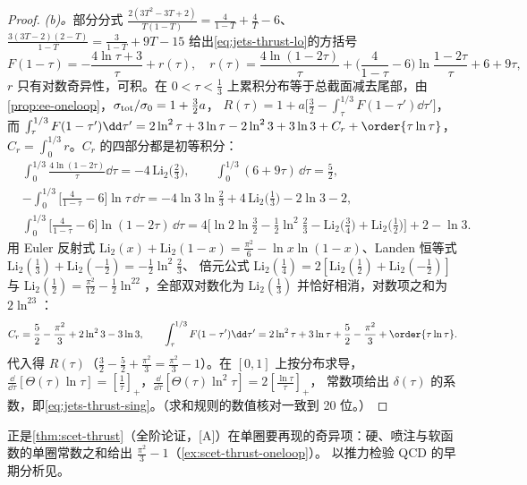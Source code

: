 \begin{proof}
\emph{(b)。}部分分式 $\frac{2(3T^2-3T+2)}{T(1-T)}=\frac{4}{1-T}+\frac4T-6$、$\frac{3(3T-2)(2-T)}{1-T}=\frac{3}{1-T}+9T-15$ 给出\cref{eq:jets-thrust-lo}的方括号
\begin{equation}\label{eq:jets-F-split}
F(1-\tau)=-\frac{4\ln\tau+3}{\tau}+r(\tau),\quad
r(\tau)=\frac{4\ln(1-2\tau)}{\tau}+\Big(\frac{4}{1-\tau}-6\Big)\ln\frac{1-2\tau}{\tau}+6+9\tau ,
\end{equation}
$r$ 只有对数奇异性，可积。在 $0<\tau<\frac13$ 上累积分布等于总截面减去尾部，由\cref{prop:ee-oneloop}，$\sigma_{\rm tot}/\sigma_0=1+\frac32a$，
$R(\tau)=1+a\big[\frac32-\int_\tau^{1/3}F(1-\tau')\dd\tau'\big]$，而
$\int_\tau^{1/3}F(1-\tau')\dd\tau'=2\ln^2\tau+3\ln\tau-2\ln^23+3\ln3+C_r+\order{\tau\ln\tau}$，$C_r=\int_0^{1/3}r$。$C_r$ 的四部分都是初等积分：
\[
\begin{aligned}
&\int_0^{1/3}\frac{4\ln(1-2\tau)}{\tau}\dd\tau=-4\,\mathrm{Li}_2\big(\tfrac23\big),\qquad \int_0^{1/3}(6+9\tau)\,\dd\tau=\tfrac52,\\
&-\int_0^{1/3}\Big[\frac{4}{1-\tau}-6\Big]\ln\tau\,\dd\tau=-4\ln3\ln\tfrac23+4\,\mathrm{Li}_2\big(\tfrac13\big)-2\ln3-2,\\
&\int_0^{1/3}\Big[\frac{4}{1-\tau}-6\Big]\ln(1-2\tau)\,\dd\tau=4\Big[\ln2\ln\tfrac32-\tfrac12\ln^2\tfrac23-\mathrm{Li}_2\big(\tfrac34\big)+\mathrm{Li}_2\big(\tfrac12\big)\Big]+2-\ln3 .
\end{aligned}
\]
用 Euler 反射式 $\mathrm{Li}_2(x)+\mathrm{Li}_2(1-x)=\frac{\pi^2}{6}-\ln x\ln(1-x)$、Landen 恒等式 $\mathrm{Li}_2(\frac13)+\mathrm{Li}_2(-\frac12)=-\frac12\ln^2\frac23$、
倍元公式 $\mathrm{Li}_2(\frac14)=2[\mathrm{Li}_2(\frac12)+\mathrm{Li}_2(-\frac12)]$ 与 $\mathrm{Li}_2(\frac12)=\frac{\pi^2}{12}-\frac12\ln^22$，全部双对数化为 $\mathrm{Li}_2(\frac13)$ 并恰好相消，对数项之和为 $2\ln^23$：
\begin{equation}\label{eq:jets-Cr}
C_r=\frac52-\frac{\pi^2}{3}+2\ln^23-3\ln3 ,\qquad
\int_\tau^{1/3}F(1-\tau')\dd\tau'=2\ln^2\tau+3\ln\tau+\frac52-\frac{\pi^2}{3}+\order{\tau\ln\tau}.
\end{equation}
代入得 $R(\tau)$（$\frac32-\frac52+\frac{\pi^2}{3}=\frac{\pi^2}{3}-1$）。在 $[0,1]$ 上按分布求导，$\frac{\dd}{\dd\tau}[\Theta(\tau)\ln\tau]=[\frac1\tau]_+$，$\frac{\dd}{\dd\tau}[\Theta(\tau)\ln^2\tau]=2[\frac{\ln\tau}{\tau}]_+$，
常数项给出 $\delta(\tau)$ 的系数，即\cref{eq:jets-thrust-sing}。（求和规则的数值核对一致到 20 位。）
\end{proof}

正是\cref{thm:scet-thrust}（全阶论证，[A]）在单圈要再现的奇异项：硬、喷注与软函数的单圈常数之和给出 $\frac{\pi^2}{3}-1$（\cref{ex:scet-thrust-oneloop}）。
以推力检验 QCD 的早期分析见\cite{Farhi1977,DeRujula:1978vmq}。
